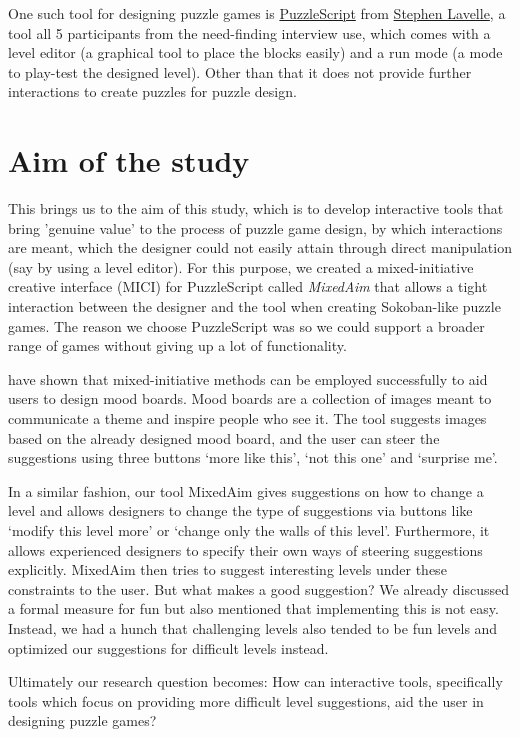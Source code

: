 One such tool for designing puzzle games is \href{https://www.puzzlescript.net}{PuzzleScript} from \href{https://www.increpare.com}{Stephen Lavelle}, a tool all 5 participants from the need-finding interview use, which comes with a level editor (a graphical tool to place the blocks easily) and a run mode (a mode to play-test the designed level). Other than that it does not provide further interactions to create puzzles for puzzle design.


\section{Aim of the study}

This brings us to the aim of this study, which is to develop interactive tools that bring 'genuine value' to the process of puzzle game design, by which interactions are meant, which the designer could not easily attain through direct manipulation (say by using a level editor). For this purpose, we created a mixed-initiative creative interface (MICI) for PuzzleScript called \textit{MixedAim} that allows a tight interaction between the designer and the tool when creating Sokoban-like puzzle games. The reason we choose PuzzleScript was so we could support a broader range of games without giving up a lot of functionality.


\cite{Koch} have shown that mixed-initiative methods can be employed successfully to aid users to design mood boards. Mood boards are a collection of images meant to communicate a theme and inspire people who see it. 
The tool suggests images based on the already designed mood board, and the user can steer the suggestions using three buttons `more like this', `not this one' and `surprise me'.

In a similar fashion, our tool MixedAim gives suggestions on how to change a level and allows designers to change the type of suggestions via buttons like `modify this level more' or `change only the walls of this level'. Furthermore, it allows experienced designers to specify their own ways of steering suggestions explicitly.
MixedAim then tries to suggest interesting levels under these constraints to the user. But what makes a good suggestion? We already discussed a formal measure for fun but also mentioned that implementing this is not easy. Instead, we had a hunch that challenging levels also tended to be fun levels and optimized our suggestions for difficult levels instead.

Ultimately our research question becomes: How can interactive tools, specifically tools which focus on providing more difficult level suggestions, aid the user in designing puzzle games?
